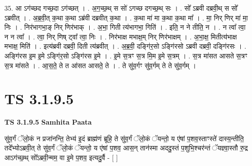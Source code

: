 \documentclass[17pt]{extarticle}
\begin{document}
35. आ ऽग॑च्छद गच्छ॒दा ऽग॑च्छत् । . अ॒ग॒च्छ॒थ् स सो॑ ऽगच्छ दगच्छ॒थ् सः । . सो᳚ ऽब्रवी दब्रवी॒थ् स सो᳚ ऽब्रवीत् । . अ॒ब्र॒वी॒त् क॒था क॒था ऽब्र॑वी दब्रवीत् क॒था । . क॒था मा॑ मा क॒था क॒था मा᳚ । . मा॒ निर् णिर् मा॑ मा॒ निः । . निर॑भागभा॒ङ् निर् णिर॑भाक् । . अ॒भा॒ गिती त्य॑भागभा॒ गिति॑ । . इति॒ न ने तीति॒ न । . न त्वा᳚ त्वा॒ न न त्वा᳚ । . त्वा॒ निर् णिष् ट्वा᳚ त्वा॒ निः । . निर॑भाक्ष मभाक्ष॒म् निर् णिर॑भाक्षम् । . अ॒भा॒क्ष॒ मितीत्य॑भाक्ष मभाक्ष॒ मिति॑ । . इत्य॑ब्रवी दब्रवी॒ दिती त्य॑ब्रवीत् । . अ॒ब्र॒वी॒ दङ्गि॑र॒सो ऽङ्गि॑रसो ऽब्रवी दब्रवी॒ दङ्गि॑रसः । . अङ्गि॑रस इ॒म इ॒मे ऽङ्गि॑र॒सो ऽङ्गि॑रस इ॒मे । . इ॒मे स॒त्रꣳ स॒त्र मि॒म इ॒मे स॒त्रम् । . स॒त्र मा॑सत आसते स॒त्रꣳ स॒त्र मा॑सते । . आ॒स॒ते॒ ते त आ॑सत आसते॒ ते । . ते सु॑व॒र्गꣳ सु॑व॒र्गम् ते ते सु॑व॒र्गम् । \newline
\pagebreak
{}

\section{ TS 3.1.9.5 }

\textbf{TS 3.1.9.5 } \newline
\textbf{Samhita Paata} \newline

सु॑व॒र्गं ॅलो॒कं न प्रजा॑नन्ति॒ तेभ्य॑ इ॒दं ब्राह्म॑णं ब्रूहि॒ ते सु॑व॒र्गं ॅलो॒कं ॅयन्तो॒ य ए॑षां प॒शव॒स्ताꣳस्ते॑ दास्य॒न्तीति॒ तदे᳚भ्योऽब्रवी॒त् ते सु॑व॒र्गं ॅलो॒कं ॅयन्तो॒ य ए॑षां प॒शव॒ आस॒न् तान॑स्मा अददु॒स्तं प॒शुभि॒श्चर॑न्तं ॅयज्ञ्वा॒स्तौ रु॒द्र आऽग॑च्छ॒थ् सो᳚ऽब्रवी॒न्मम॒ वा इ॒मे प॒शव॒ इत्यदु॒र्वै - [  ] \newline
\end{document}
